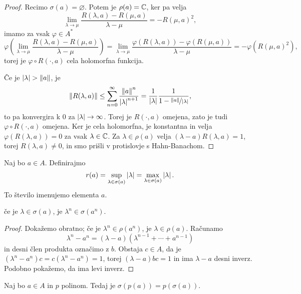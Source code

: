 \begin{proof}
  Recimo $\sigma(a) = \varnothing$.
  Potem je $\rho(a) = \mathbb{C}$, ker pa velja
  \[
	\lim_{\lambda \to \mu} \frac{R(\lambda, a) - R(\mu, a)}{\lambda - \mu} =
	-R(\mu, a)^2,
  \]
  imamo za vsak $\varphi \in A^*$
  \[
	\varphi\!\left( \lim_{\lambda \to \mu} \frac{R(\lambda, a) - R(\mu,
		a)}{\lambda - \mu} \right)
	= \lim_{\lambda \to \mu} \frac{\varphi(R(\lambda, a)) - \varphi(R(\mu,
	  a))}{\lambda - \mu}
	= - \varphi(R(\mu, a)^2),
  \]
  torej je $\varphi \circ R(\cdot, a)$ cela holomorfna funkcija.

  Če je $\left| \lambda \right| > \left\lVert a\right\rVert$, je
  \[
	\left\lVert R(\lambda, a)\right\rVert \le \sum_{n=0}^\infty
	\frac{\left\lVert a\right\rVert^n}{\left| \lambda \right|^{n+1}}
	= \frac{1}{\left| \lambda \right|} \frac{1}{1 - \nicefrac{\left\lVert a\right\rVert}{\left| \lambda \right|}},
  \]
  to pa konvergira k $0$ za $\left| \lambda \right| \to \infty$.
  Torej je $R(\cdot, a)$ omejena, zato je tudi $\varphi \circ R(\cdot, a)$
  omejena.
  Ker je cela holomorfna, je konstantna in velja $\varphi(R(\lambda, a)) = 0$ za
  vsak $\lambda \in \mathbb{C}$.
  Za $\lambda \in \rho(a)$ velja $(\lambda - a)R(\lambda, a) = 1$, torej
  $R(\lambda, a) \ne 0$, in smo prišli v protislovje s Hahn-Banachom.
\end{proof}


\begin{definicija}
  Naj bo $a \in A$.
  Definirajmo
  \[
	r(a) = \sup_{\lambda \in \sigma(a)} \left| \lambda \right| = \max_{\lambda \in
	  \sigma(a)} \left| \lambda \right|.
  \]
  To število imenujemo  elementa $a$.
\end{definicija}

\begin{lema}
  če je $\lambda \in \sigma(a)$, je $\lambda^n \in \sigma(a^n)$.
\end{lema}

\begin{proof}
  Dokažemo obratno; če je $\lambda^n \in \rho(a^n)$, je $\lambda \in \rho(a)$.
  Računamo
  \[
	\lambda^n - a^n = (\lambda -a)(\lambda^{n-1} + \cdots + a^{n-1})
  \]
  in desni člen produkta označimo z $b$.
  Obstaja $c \in A$, da je $(\lambda^n - a^n)c = c(\lambda^n - a^n) =1$, torej
  $(\lambda - a)bc = 1$ in ima $\lambda - a$ desni inverz.
  Podobno pokažemo, da ima levi inverz.
\end{proof}

\begin{trditev}
  Naj bo $a \in A$ in $p$ polinom.
  Tedaj je $\sigma(p(a)) = p(\sigma(a))$.
\end{trditev}

